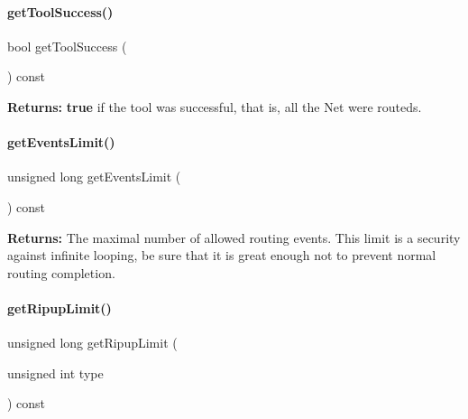 \paragraph{\texorpdfstring{get\+Tool\+Success()}{getToolSuccess()}}
{\footnotesize\ttfamily bool get\+Tool\+Success (\begin{DoxyParamCaption}{ }\end{DoxyParamCaption}) const\hspace{0.3cm}{\ttfamily [inline]}}

{\bfseries Returns\+:} {\bfseries true} if the tool was successful, that is, all the Net were routeds. \mbox{\label{classKite_1_1KiteEngine_abb19e465ef249651bfc0efbe6f23ef1d}} 
\paragraph{\texorpdfstring{get\+Events\+Limit()}{getEventsLimit()}}
{\footnotesize\ttfamily unsigned long get\+Events\+Limit (\begin{DoxyParamCaption}{ }\end{DoxyParamCaption}) const\hspace{0.3cm}{\ttfamily [inline]}}

{\bfseries Returns\+:} The maximal number of allowed routing events. This limit is a security against infinite looping, be sure that it is great enough not to prevent normal routing completion. \mbox{\label{classKite_1_1KiteEngine_aa9cc4f640a8b50dc1bcff8d938a09c3c}} 
\paragraph{\texorpdfstring{get\+Ripup\+Limit()}{getRipupLimit()}}
{\footnotesize\ttfamily unsigned long get\+Ripup\+Limit (\begin{DoxyParamCaption}\item[{unsigned int}]{type }\end{DoxyParamCaption}) const\hspace{0.3cm}{\ttfamily [inline]}}


